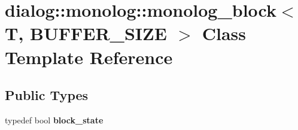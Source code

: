 \hypertarget{classdialog_1_1monolog_1_1monolog__block}{}\section{dialog\+:\+:monolog\+:\+:monolog\+\_\+block$<$ T, B\+U\+F\+F\+E\+R\+\_\+\+S\+I\+ZE $>$ Class Template Reference}
\label{classdialog_1_1monolog_1_1monolog__block}
\subsection*{Public Types}
\begin{DoxyCompactItemize}
\item 
\mbox{\label{classdialog_1_1monolog_1_1monolog__block_ab4e944acf2c4accd9063fb5955cd9c1b}} 
typedef bool {\bfseries block\+\_\+state}
\end{DoxyCompactItemize}
